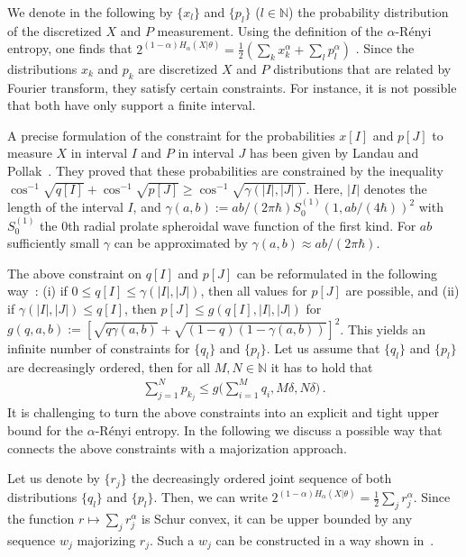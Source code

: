 \documentclass[aps,amsfonts,twoside,amssymb,superscriptaddress,twocolumn]{revtex4-1}
\begin{document}
We denote in the following by $\{x_l\}$ and $\{p_l\}$ ($l\in \mathbb N$) the probability distribution of the discretized $X$ and $P$ measurement. Using the definition of the $\alpha$-R{\'e}nyi entropy, one finds that $2^{(1-\alpha)H_\alpha(X|\theta)} = \frac 12 (\sum_k x_k^\alpha + \sum_l p_l^\alpha )$ . Since the distributions $x_k$ and $p_k$ are discretized $X$ and $P$ distributions that are related by Fourier transform, they satisfy certain constraints. For instance, it is not possible that both have only support a finite interval. 

A precise formulation of the constraint for the probabilities $x[I]$ and $p[J]$ to measure $X$ in interval $I$ and $P$ in interval $J$ has been given by Landau and Pollak~\cite{Landau61}. They proved that these probabilities are constrained by the inequality $\cos^{-1}\sqrt{q[I]} + \cos^{-1}\sqrt{p[J]} \geq \cos^{-1}\sqrt{\gamma(|I|,|J|)} $. Here, $|I|$ denotes the length of the interval $I$, and $\gamma(a,b) := {ab}/({2\pi\hbar}) S_0^{(1)}\left(1,{ab}/({4\hbar})\right)^2 $ with $S_0^{(1)}$ the 0th radial prolate spheroidal wave function of the first kind. For $ab$ sufficiently small $\gamma$ can be approximated by $\gamma(a,b)\approx ab/(2\pi\hbar)$. 

The above constraint on $q[I]$ and $p[J]$ can be reformulated in the following way~\cite{DymMcKean}: (i) if $0\leq  q[I] \leq \gamma(|I|,|J|)$, then all values for $p[J]$ are possible, and (ii) if $\gamma(|I|,|J|)\leq q[I]$, then $p[J]\leq g(q[I],|I|,|J|)$ for $g(q,a,b):= [\sqrt{q \gamma(a,b)} + \sqrt { (1-q) (1-\gamma(a,b) )}]^2 $. This yields an infinite number of constraints for $\{q_l\}$ and $\{p_l\}$. Let us assume that $\{q_l\}$ and $\{p_l\}$ are decreasingly ordered,  then for all $M,N \in \mathbb{N}$ it has to hold that 
\begin{align}\label{eq:ConstrSet3}
 	\sum_{j=1}^N  p_{k_j} \leq  g\big(\sum_{i=1}^M q_i , M\delta, N\delta \big) \, . 
\end{align}
It is challenging to turn the above constraints into an explicit and tight upper bound for the $\alpha$-R{\'e}nyi entropy. In the following we discuss a possible way that connects the above constraints with a majorization approach. 
 
Let us denote by $\{r_j\}$ the decreasingly ordered joint sequence of both distributions $\{q_l\}$ and $\{p_l\}$. Then, we can write $2^{(1-\alpha)H_\alpha(X|\theta)} = \frac 12 \sum_j r_j^\alpha $. Since the function $r\mapsto \sum_j r_j^\alpha$ is Schur convex, it can be upper bounded by any sequence $w_j$ majorizing $r_j$. Such a $w_j$ can be constructed in a way shown in~\cite{rudnicki2015}. 
\end{document}
